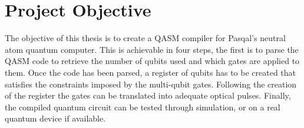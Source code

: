 \section{Project Objective}
\label{sec:objective}

The objective of this thesis is to create a QASM compiler for Pasqal's neutral atom quantum computer. 
This is achievable in four steps, the first is to parse the QASM code to retrieve the number of qubits 
used and which gates are applied to them. Once the code has been parsed, a register of qubits has to be 
created that satisfies the constraints imposed by the multi-qubit gates. Following the creation of the register 
the gates can be translated into adequate optical pulses. 
Finally, the compiled quantum circuit can be tested through simulation, or on a real quantum device if available.
